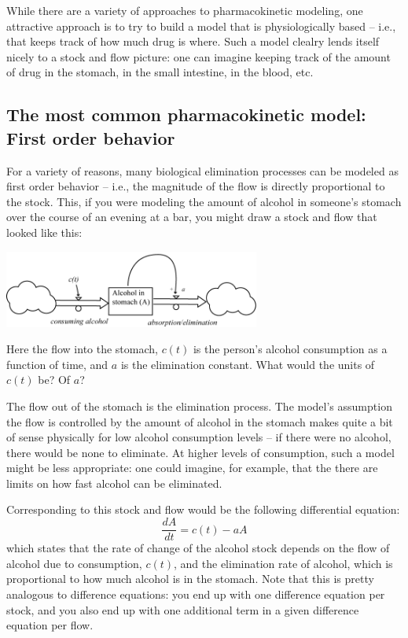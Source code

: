 \documentclass[10pt]{book}
\newcommand{\beforefig}{\vspace{0.2in}}
\newcommand{\afterfig}{\vspace{0.2in}}
\begin{document}
While there are a variety of approaches to pharmacokinetic modeling, one attractive approach is to try to build a model that is physiologically based -- i.e., that keeps track of how much drug is where.  Such a model clealry lends itself nicely to a stock and flow picture: one can imagine keeping track of the amount of drug in the stomach, in the small intestine, in the blood, etc.  

\subsection{The most common pharmacokinetic model: First order behavior}

For a variety of reasons, many biological elimination processes can be modeled as first order behavior -- i.e., the magnitude of the flow is directly proportional to the stock.  This, if you were modeling the amount of alcohol in someone's stomach over the course of an evening at a bar, you might  draw a stock and flow that looked like this:

\beforefig
 \centerline{\includegraphics[height=1in]{figs/AlcoholExample1}}
\afterfig

Here the flow into the stomach, $c(t)$  is the person's alcohol consumption as a function of time, and $a$ is the elimination constant.  What would the units of $c(t)$ be?  Of $a$?

The flow out of the stomach is the elimination process.  The model's assumption the flow is controlled by the amount of alcohol in the stomach  makes quite a bit of sense physically  for low alcohol consumption levels -- if there were no alcohol, there would be none to eliminate.  At higher levels of consumption, such a model might be less appropriate:  one could imagine, for example, that the there are limits on how fast alcohol can be eliminated.

Corresponding to this stock and flow would be the following differential equation:
$$\frac{dA}{dt} = c(t) - aA$$
which states that the rate of change of the alcohol stock depends on the flow of alcohol due to consumption, $c(t)$, and the elimination rate of alcohol, which is proportional to how much alcohol is in the stomach. Note that this is pretty analogous to difference equations:  you end up with one difference equation per stock, and you also end up with one additional term in a given difference equation per flow.  
\end{document}
